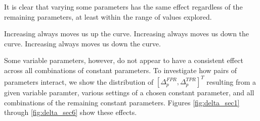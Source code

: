 
It is clear that varying some parameters has the same effect regardless of the
remaining parameters, at least within the range of values explored. 



Increasing  always moves us up the curve.
Increasing  always moves us down the curve.
Increasing  always moves us down the curve.

\clearpage
Some variable parameters, however, do not appear to have a consistent effect
across all combinations of constant parameters. To investigate how pairs of
parameters interact, we show the distribution of $[\Delta_p^{FPR},
  \Delta_p^{TPR}]^T$ resulting from a given variable paramter, various settings
of a chosen constant parameter, and all combinations of the remaining constant
parameters. Figures \ref{fig:delta_sec1} through \ref{fig:delta_sec6} show these
effects.

